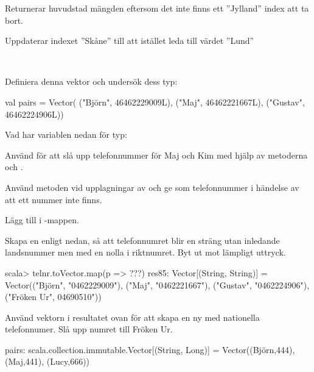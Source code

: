 {{\SubtaskSolved 
Returnerar huvudstad mängden eftersom det inte finns ett ''Jylland'' index att ta bort.

\SubtaskSolved 
Uppdaterar indexet ''Skåne'' till att istället leda till värdet ''Lund''


\QUESTEND









\QUESTBEGIN

\Task  \what~ 

\Subtask Definiera denna vektor och undersök dess typ:
\begin{Code}
val pairs = Vector(
  ("Björn", 46462229009L),
  ("Maj", 46462221667L),
  ("Gustav", 46462224906L))
\end{Code}

\Subtask Vad har variablen  nedan för typ: \\ 

\Subtask Använd  för att slå upp telefonnummer för Maj och Kim med hjälp av metoderna  och .

\Subtask Använd metoden  vid upplagningar av  och ge  som telefonnummer i händelse av att ett nummer inte finns.

\Subtask Lägg till  i -mappen.

\Subtask Skapa en  enligt nedan, så att telefonnumret blir en sträng utan inledande landsnummer men med en nolla i riktnumret. Byt ut  mot lämpligt uttryck.
\begin{REPL}
scala> telnr.toVector.map(p => ???)
res85: Vector[(String, String)] = Vector(("Björn", "0462229009"), ("Maj",
"0462221667"), ("Gustav", "0462224906"), ("Fröken Ur", 04690510"))

\end{REPL}

\Subtask Använd vektorn i resultatet ovan för att skapa en ny  med nationella telefonnumer. Slå upp numret till Fröken Ur.

\SOLUTION


\TaskSolved \what
 

\SubtaskSolved 
\begin{REPLnonum}
pairs: scala.collection.immutable.Vector[(String, Long)] =
					Vector((Björn,444), (Maj,441), (Lucy,666))
\end{REPLnonum}

}}
